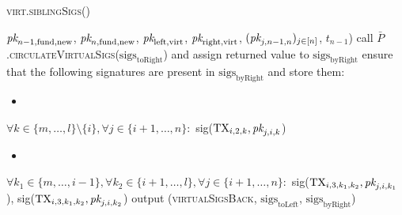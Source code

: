 \begin{center}
\begin{processbox}{\textsc{virt.siblingSigs}()}
\begin{algorithmic}[1]
        $\textit{pk}_{n-1, \mathrm{fund}, \mathrm{new}}$, $\textit{pk}_{n, \mathrm{fund},
        \mathrm{new}}$, $\textit{pk}_{\mathrm{left}, \mathrm{virt}}$,
        $\textit{pk}_{\mathrm{right}, \mathrm{virt}}$, $(\textit{pk}_{j, n-1, n})_{j \in [n]}$,
        $t_{n-1}$)
      \EndIf
      \Statex
      \State call
      $\bar{P}$.\textsc{circulateVirtualSigs}($\mathrm{sigs}_{\mathrm{toRight}}$)
      and assign returned value to $\mathrm{sigs}_{\mathrm{byRight}}$
      \State ensure that the following signatures are present in
      $\mathrm{sigs}_{\mathrm{byRight}}$ and store them:
      \begin{itemize}
        \item {}
      \end{itemize}
      \Indent
        \State $\forall k \in \{m, \dots, l\} \setminus \{i\}, \forall j \in
        \{i+1, \dots, n\}:$
        \Indent
          \State sig($\mathrm{TX}_{i, 2, k}, \textit{pk}_{j, i, k}$)
        \EndIndent
      \EndIndent
      \begin{itemize}
        \item {}
      \end{itemize}
      \Indent
        \State $\forall k_1 \in \{m, \dots, i-1\}, \forall k_2 \in \{i+1, \dots,
        l\}, \forall j \in \{i+1, \dots, n\}:$
        \Indent
          \State sig($\mathrm{TX}_{i, 3, k_1, k_2}, \textit{pk}_{j, i, k_1}$),
          sig($\mathrm{TX}_{i, 3, k_1, k_2}, \textit{pk}_{j, i, k_2}$)
        \EndIndent
      \EndIndent
      \State output (\textsc{virtualSigsBack},
      $\mathrm{sigs}_{\mathrm{toLeft}}$, $\mathrm{sigs}_{\mathrm{byRight}}$)
    \end{algorithmic}
  \end{processbox}
  \label{code:virtual-layer:sibling-sigs}
\end{center} \ \\

